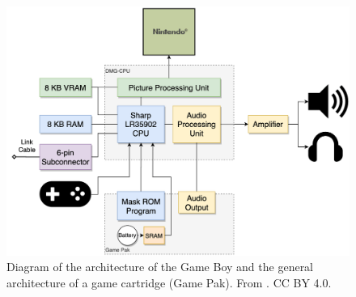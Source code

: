 \begin{figure}[H]
    \centering
    \includegraphics[scale=0.35]{figures/gbdiagram.png}
    \caption{Diagram of the architecture of the Game Boy and the general architecture of a game cartridge (Game Pak). From \cite{gameboyarchitecture}. CC BY 4.0.}
    \label{fig:GameBoyArch-fig}
\end{figure}





